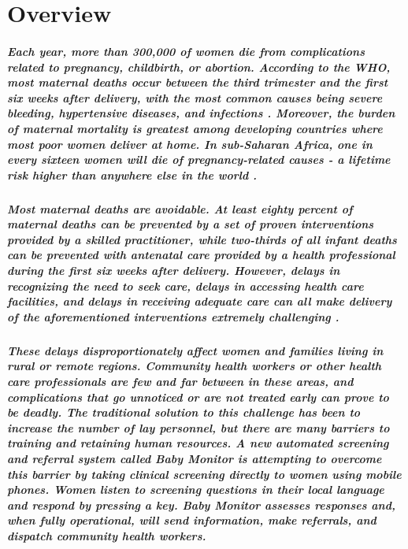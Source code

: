 \chapter{Overview}

\paragraph{Each year, more than 300,000 of women die from complications related to pregnancy, childbirth, or abortion. According to the WHO, most maternal deaths occur between the third trimester and the first six weeks after delivery, with the most common causes being severe bleeding, hypertensive diseases, and infections \citep{WHO2012}. Moreover, the burden of maternal mortality is greatest among developing countries where most poor women deliver at home. In sub-Saharan Africa, one in every sixteen women will die of pregnancy-related causes - a lifetime risk higher than anywhere else in the world \citep{Ronsmans2006}.}

\paragraph{Most maternal deaths are avoidable. At least eighty percent of maternal deaths can be prevented by a set of proven interventions provided by a skilled practitioner, while two-thirds of all infant deaths can be prevented with antenatal care provided by a health professional during the first six weeks after delivery. However, delays in recognizing the need to seek care, delays in accessing  health care facilities, and delays in receiving adequate care can all make delivery of the aforementioned interventions extremely challenging \citep{Thaddeus1994}.}

\paragraph{These delays disproportionately affect women and families living in rural or remote regions. Community health workers or other health care professionals are few and far between in these areas, and complications that go unnoticed or are not treated early can prove to be deadly. The traditional solution to this challenge has been to increase the number of lay personnel, but there are many barriers to training and retaining human resources. A new automated screening and referral system called Baby Monitor is attempting to overcome this barrier by taking clinical screening directly to women using mobile phones. Women listen to screening questions in their local language and respond by pressing a key. Baby Monitor assesses responses and, when fully operational, will send information, make referrals, and dispatch community health workers.}

